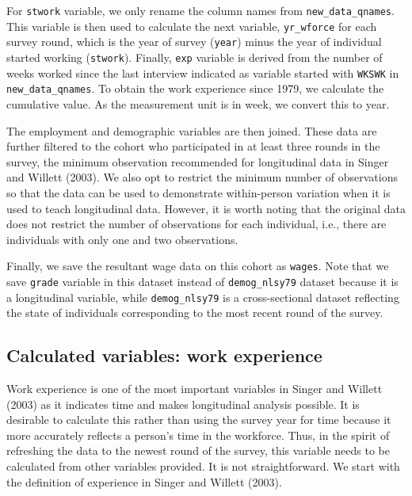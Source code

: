 \documentclass[12pt]{article}
\begin{document}
For \texttt{stwork} variable, we only rename the column names from \texttt{new\_data\_qnames}. This variable is then used to calculate the next variable, \texttt{yr\_wforce} for each survey round, which is the year of survey (\texttt{year}) minus the year of individual started working (\texttt{stwork}). Finally, \texttt{exp} variable is derived from the number of weeks worked since the last interview indicated as variable started with \texttt{WKSWK} in \texttt{new\_data\_qnames}. To obtain the work experience since 1979, we calculate the cumulative value. As the measurement unit is in week, we convert this to year.

The employment and demographic variables are then joined. These data are further filtered to the cohort who participated in at least three rounds in the survey, the minimum observation recommended for longitudinal data in Singer and Willett (2003). We also opt to restrict the minimum number of observations so that the data can be used to demonstrate within-person variation when it is used to teach longitudinal data. However, it is worth noting that the original data does not restrict the number of observations for each individual, i.e., there are individuals with only one and two observations.

Finally, we save the resultant wage data on this cohort as \texttt{wages}. Note that we save \texttt{grade} variable in this dataset instead of \texttt{demog\_nlsy79} dataset because it is a longitudinal variable, while \texttt{demog\_nlsy79} is a cross-sectional dataset reflecting the state of individuals corresponding to the most recent round of the survey.

\hypertarget{calculated-variables-work-experience}{%
\subsection{Calculated variables: work experience}\label{calculated-variables-work-experience}}

Work experience is one of the most important variables in Singer and Willett (2003) as it indicates time and makes longitudinal analysis possible. It is desirable to calculate this rather than using the survey year for time because it more accurately reflects a person's time in the workforce. Thus, in the spirit of refreshing the data to the newest round of the survey, this variable needs to be calculated from other variables provided. It is not straightforward. We start with the definition of experience in Singer and Willett (2003).
\end{document}
